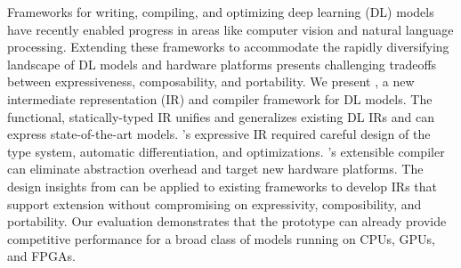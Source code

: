 Frameworks for writing, compiling, and optimizing
  deep learning (DL) models have recently
  enabled progress in areas like computer
  vision and natural language processing.
Extending these frameworks to accommodate
  the rapidly diversifying landscape of
  DL models and hardware platforms presents
  challenging tradeoffs between
  expressiveness, composability, and portability.
We present \relay,
  a new intermediate representation (IR)
  and compiler framework for DL models.
The functional, statically-typed \relay IR
  unifies and generalizes existing DL IRs
  and can express state-of-the-art models.
\relay's expressive IR required careful design of
  the type system, automatic differentiation, and optimizations.
\relay's extensible compiler
  can eliminate abstraction overhead and
  target new hardware platforms.
The design insights from \relay
  can be applied to existing frameworks
  to develop IRs that support extension
  without compromising on expressivity, composibility, and portability.
Our evaluation demonstrates that
  the \relay prototype can already provide
  competitive performance for a broad class of models
  running on CPUs, GPUs, and FPGAs.


